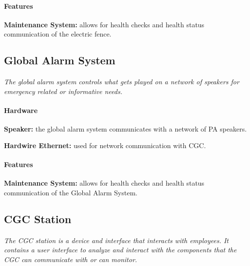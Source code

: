 \documentclass[12pt]{article}
\begin{document}
	\paragraph{Features}
	\begin{list}{}{}
		\item \textbf{Maintenance System: }allows for health checks and health status communication of the electric fence.
	\end{list}

	\subsection{Global Alarm System}
	\paragraph{} \textit{The global alarm system controls what gets played on a network of speakers for emergency related or informative needs.}		

	\paragraph{Hardware}
	\begin{list}{}{}
		\item \textbf{Speaker: }the global alarm system communicates with a network of PA speakers.
		\item \textbf{Hardwire Ethernet: }used for network communication with CGC. 
	\end{list}
	
	\paragraph{Features}
	\begin{list}{}{}
		\item \textbf{Maintenance System: }allows for health checks and health status communication of the Global Alarm System.  
	\end{list}


	\subsection{CGC Station}
	\paragraph{} \textit{The CGC station is a device and interface that interacts with employees. It contains a user interface to analyze and interact with the components that the CGC can communicate with or can monitor. }		
	
\end{document}
